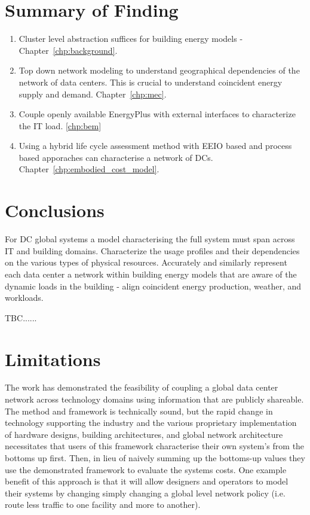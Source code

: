 \section{Summary of Finding}
\begin{enumerate}
    \item Cluster level abstraction suffices for building energy models - Chapter~\ref{chp:background}.
    \item Top down network modeling to understand geographical dependencies of the network of data centers. This is crucial to understand coincident energy supply and demand. Chapter~\ref{chp:mec}.
    \item Couple openly available EnergyPlus with external interfaces to characterize the IT load. \ref{chp:bem}
    \item Using a hybrid life cycle assessment method with EEIO based and process based apporaches can characterise a network of DCs. Chapter~\ref{chp:embodied_cost_model}.
\end{enumerate}

\section{Conclusions}
For DC global systems a model characterising the full system must span across IT and building domains. Characterize the usage profiles and their dependencies on the various types of physical resources. Accurately and similarly represent each data center a network within building energy models that are aware of the dynamic loads in the building - align coincident energy production, weather, and workloads.

TBC......

\section{Limitations}
The work has demonstrated the feasibility of coupling a global data center network across technology domains using information that are publicly shareable. The method and framework is technically sound, but the rapid change in technology supporting the industry and the various proprietary implementation of hardware designs, building architectures, and global network architecture necessitates that users of this framework characterise their own system's from the bottoms up first. Then, in lieu of naively summing up the bottoms-up values they use the demonstrated framework to evaluate the systems costs. One example benefit of this approach is that it will allow designers and operators to model their systems by changing simply changing a global level network policy (i.e. route less traffic to one facility and more to another).


